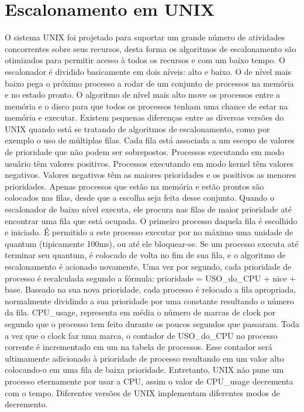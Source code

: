 \section{Escalonamento em UNIX}
O sistema UNIX foi projetado para suportar um grande número de atividades concorrentes sobre seus recursos, desta forma os algoritmos de escalonamento são otimizados para permitir acesso à todos os recursos e com um baixo tempo. O escalonador é dividido basicamente em dois níveis: alto e baixo. O de nível mais baixo pega o próximo processo a rodar de um conjunto de processos na memória e no estado pronto. O algoritmo de nível mais alto move os processos entre a memória e o disco para que todos os processos tenham uma chance de estar na memória e executar.
Existem pequenas diferenças entre as diversas versões do UNIX quando está se tratando de algoritmos de escalonamento, como por exemplo o uso de múltiplas filas. Cada fila está associada a um escopo de valores de prioridade que não podem ser sobrepostos. Processos executando em modo usuário têm valores positivos.
Processos executando em modo kernel têm valores negativos. Valores negativos têm as maiores prioridades e os positivos as menores prioridades. Apenas processos que estão na memória e estão prontos são colocados nas filas, desde que a escolha seja feita desse conjunto.
Quando o escalonador de baixo nível executa, ele procura nas filas de maior prioridade até encontrar uma fila que está ocupada. O primeiro processo daquela fila é escolhido e iniciado. É permitido a este processo executar por no máximo uma unidade de quantum (tipicamente 100ms), ou até ele bloquear-se. Se um processo executa até terminar seu quantum, é colocado de volta no fim de sua fila, e o algoritmo de escalonamento é acionado novamente. 
Uma vez por segundo, cada prioridade de processo é recalculada segundo a fórmula: 
	prioridade = USO_do_CPU + nice + base.
Baseado na sua nova prioridade, cada processo é relocado a fila apropriada, normalmente dividindo a sua prioridade por uma constante resultando o número da fila. CPU_usage, representa em média o número de marcas de clock por segundo que o processo tem feito durante os poucos segundos que passaram.
Toda a vez que o clock faz uma marca, o contador de USO_do_CPU no processo corrente é incrementado em um na tabela de processos. Esse contador será ultimamente adicionado à prioridade de processo resultando em um valor alto colocando-o em uma fila de baixa prioridade.
Entretanto, UNIX não pune um processo eternamente por usar a CPU, assim o valor de CPU_usage decrementa com o tempo. Diferentes versões de UNIX implementam diferentes modos de decremento.

